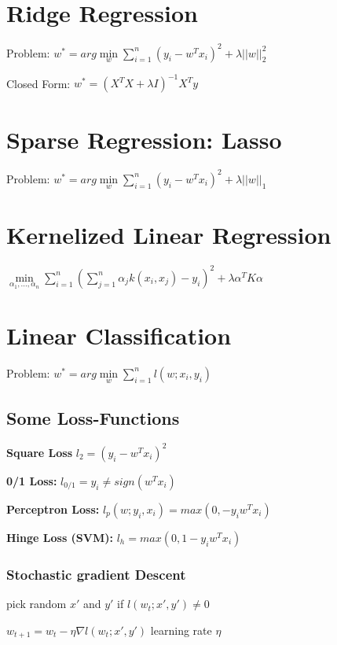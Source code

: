 \documentclass[11pt,twocolumn]{article}
\begin{document}
\section{Ridge Regression}

Problem: $ w^* =  arg \min \limits_w \sum \limits_{i=1}^n \left(y_i - w^Tx_i\right)^2 + \lambda ||w||_2^2$

Closed Form: $w^* = \left(X^T X + \lambda I \right)^{-1} X^T y$

\section{Sparse Regression: Lasso}

Problem: $ w^* =  arg \min \limits_w \sum \limits_{i=1}^n \left(y_i - w^Tx_i\right)^2 + \lambda ||w||_1$


\section{Kernelized Linear Regression}

$\min \limits_{\alpha_1,...,\alpha_n} \sum \limits_{i=1}^n\left( \sum \limits_{j=1}^n \alpha_j k(x_i,x_j) - y_i \right)^2 + \lambda \alpha^T K \alpha$

\section{Linear Classification}

Problem: $ w^* =  arg \min \limits_w \sum \limits_{i=1}^n l\left(w;x_i,y_i\right)$


\subsection{Some Loss-Functions}
\textbf{Square Loss} $l_2 = (y_i - w^T x_i)^2$

\textbf{0/1 Loss:} $ l_{0/1}  =  y_i \neq sign(w^Tx_i)$

\textbf{Perceptron Loss:} $l_p\left(w;y_i,x_i \right) =   max(0, -y_i w^T x_i)$

\textbf{Hinge Loss (SVM):} $l_h =   max(0, 1 -y_i w^T x_i)$

\subsubsection{Stochastic gradient Descent}
pick random $x'$ and $y'$
if $ l(w_t;x',y') \neq 0$

$w_{t+1} = w_{t} - \eta \nabla l(w_t;x', y') $  learning rate $\eta$
\end{document}
